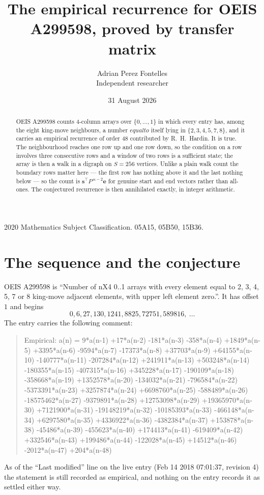 \documentclass[11pt,a4paper]{article}
\title{The empirical recurrence for OEIS A299598, proved by transfer matrix}
\author{Adrian Perez Fontelles\\ \small Independent researcher}
\date{31 August 2026}
\theoremstyle{plain}
\theoremstyle{definition}
\begin{document}
\maketitle

\begin{abstract}
OEIS A299598 counts $4$-column arrays over $\{0,\dots,1\}$ in which every entry has,
among the eight king-move neighbours, a number $equal to$ itself lying in $\{2,3,4,5,7,8\}$, and it carries an empirical
recurrence of order $48$ contributed by R.~H.~Hardin. It is true. The neighbourhood
reaches one row up and one row down, so the condition on a row involves three consecutive
rows and a window of two rows is a sufficient state; the array is then a walk in a digraph
on $S=256$ vertices. Unlike a plain walk count the boundary rows matter here --- the first
row has nothing above it and the last nothing below --- so the count is
$\mathbf{s}^{\!\top}P^{\,n-2}\mathbf{e}$ for genuine start and end vectors rather than
all-ones. The conjectured recurrence is then annihilated exactly, in integer arithmetic.
\end{abstract}

\noindent\small 2020 Mathematics Subject Classification. 05A15, 05B50, 15B36.\normalsize

\section{The sequence and the conjecture}

OEIS A299598 is ``Number of nX4 0..1 arrays with every element equal to 2, 3, 4, 5, 7 or 8 king-move adjacent elements, with upper left element zero.''. It has offset
$1$ and begins
\[
0, 6, 27, 130, 1241, 8825, 72751, 589816,\ \dots
\]
The entry carries the following comment:
\begin{quote}\small
Empirical: a(n) = 9*a(n-1) +17*a(n-2) -181*a(n-3) -358*a(n-4) +1849*a(n-5) +3395*a(n-6) -9594*a(n-7) -17373*a(n-8) +37703*a(n-9) +64155*a(n-10) -140777*a(n-11) -207284*a(n-12) +241911*a(n-13) +503248*a(n-14) -180355*a(n-15) -407315*a(n-16) +345228*a(n-17) -190109*a(n-18) -358668*a(n-19) +1352578*a(n-20) -134032*a(n-21) -796584*a(n-22) -5373391*a(n-23) +3257874*a(n-24) +6698760*a(n-25) -588489*a(n-26) -18575462*a(n-27) -9379891*a(n-28) +12753098*a(n-29) +19365970*a(n-30) +7121900*a(n-31) -19148219*a(n-32) -10185393*a(n-33) -466148*a(n-34) +6297580*a(n-35) +4336922*a(n-36) -4382384*a(n-37) +153878*a(n-38) -45486*a(n-39) -455623*a(n-40) +174413*a(n-41) -619409*a(n-42) +332546*a(n-43) +199486*a(n-44) -122028*a(n-45) +14512*a(n-46) -2012*a(n-47) +204*a(n-48)
\end{quote}
As of the ``Last modified'' line on the live entry (Feb 14 2018 07:01:37, revision
4) the statement is still recorded as empirical, and nothing on the entry
records it as settled either way.
\end{document}
